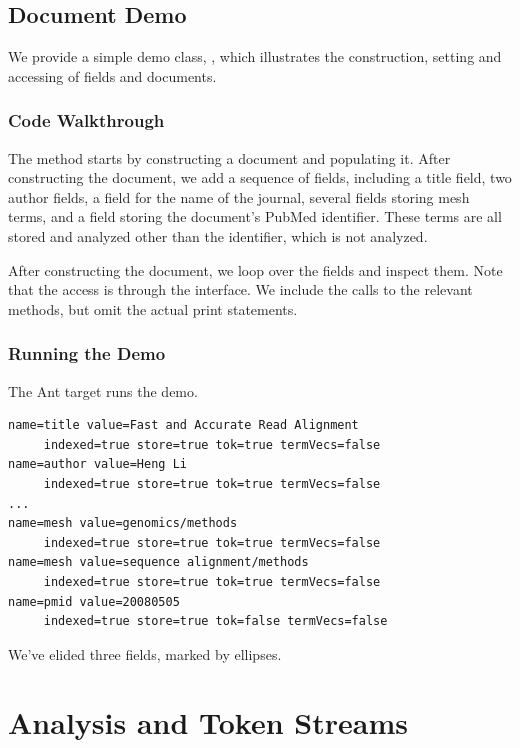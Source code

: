\subsection{Document Demo}

We provide a simple demo class, , which illustrates
the construction, setting and accessing of fields and documents.

\subsubsection{Code Walkthrough}

The  method starts by constructing a document and
populating it.
%
%
After constructing the document, we add a sequence of fields,
including a title field, two author fields, a field for the name of
the journal, several fields storing mesh terms, and a field storing
the document's PubMed identifier.
These terms are all stored
and analyzed other than the identifier, which is not analyzed.

After constructing the document, we loop over the fields and
inspect them.
%
%
Note that the access is through the  interface.
We include the calls to the relevant methods, 
but omit the actual print statements.

\subsubsection{Running the Demo}

The Ant target  runs the demo.  
%
\begin{verbatim}
name=title value=Fast and Accurate Read Alignment
     indexed=true store=true tok=true termVecs=false
name=author value=Heng Li
     indexed=true store=true tok=true termVecs=false
...
name=mesh value=genomics/methods
     indexed=true store=true tok=true termVecs=false
name=mesh value=sequence alignment/methods
     indexed=true store=true tok=true termVecs=false
name=pmid value=20080505
     indexed=true store=true tok=false termVecs=false
\end{verbatim}
%
We've elided three fields, marked by ellipses.



\section{Analysis and Token Streams}\label{section:lucene-analysis}

